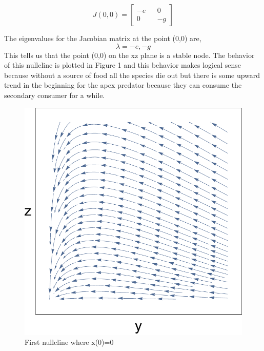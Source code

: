 \documentclass[11pt,oneside]{article}
\begin{document}
	\begin{equation}
	J(0,0) = 
	\begin{bmatrix}
	-e && 0 \\
	0 && -g
	\end{bmatrix}
	\end{equation}
	
	The eigenvalues for the Jacobian matrix at the point (0,0) are,
	\[\lambda = -e,-g\]
	This tells us that the point (0,0) on the xz plane is a stable node. The behavior of this nullcline is plotted in Figure 1 and this behavior makes logical sense because without a source of food all the species die out but there is some upward trend in the beginning for the apex predator because they can consume the secondary consumer for a while.
	\begin{figure}[H]
		\center
		\includegraphics[scale=0.5]{YZ}
		\caption{First nullcline where x(0)=0}
	\end{figure}
	
\end{document}
